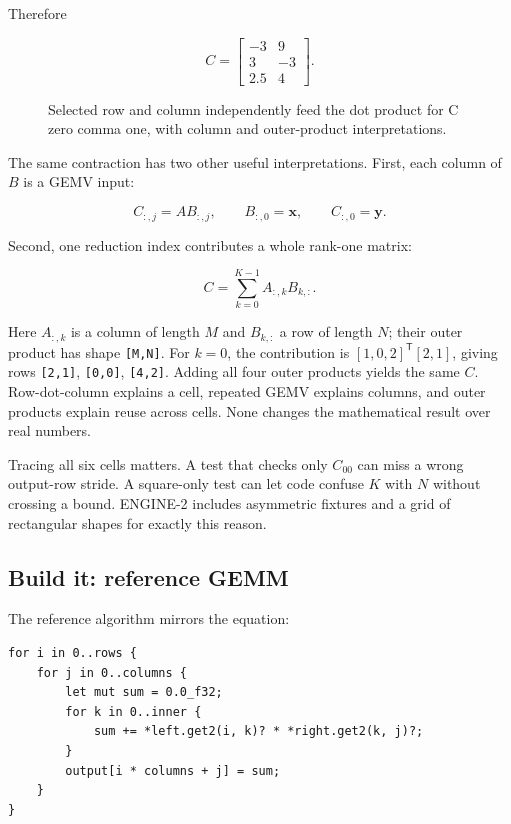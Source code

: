 \documentclass[
  10pt,
]{article}
\begin{document}
Therefore

\[
C=
\begin{bmatrix}
-3&9\\
3&-3\\
2.5&4
\end{bmatrix}.
\]

\begin{figure}[H]\centering\resizebox{\linewidth}{!}{}\caption{Selected row and column independently feed the dot product for C zero comma one, with column and outer-product interpretations.}\end{figure}

The same contraction has two other useful interpretations. First, each
column of \(B\) is a GEMV input:

\[
C_{:,j}=A B_{:,j},\qquad B_{:,0}=\mathbf{x},\qquad C_{:,0}=\mathbf{y}.
\]

Second, one reduction index contributes a whole rank-one matrix:

\[
C=\sum_{k=0}^{K-1} A_{:,k}B_{k,:}.
\]

Here \(A_{:,k}\) is a column of length \(M\) and \(B_{k,:}\) a row of
length \(N\); their outer product has shape \texttt{{[}M,N{]}}. For
\(k=0\), the contribution is \([1,0,2]^{\mathsf T}[2,1]\), giving rows
\texttt{{[}2,1{]}}, \texttt{{[}0,0{]}}, \texttt{{[}4,2{]}}. Adding all
four outer products yields the same \(C\). Row-dot-column explains a
cell, repeated GEMV explains columns, and outer products explain reuse
across cells. None changes the mathematical result over real numbers.

Tracing all six cells matters. A test that checks only \(C_{00}\) can
miss a wrong output-row stride. A square-only test can let code confuse
\(K\) with \(N\) without crossing a bound. ENGINE-2 includes asymmetric
fixtures and a grid of rectangular shapes for exactly this reason.

\subsection{Build it: reference GEMM}\label{build-it-reference-gemm}

The reference algorithm mirrors the equation:

\begin{verbatim}
for i in 0..rows {
    for j in 0..columns {
        let mut sum = 0.0_f32;
        for k in 0..inner {
            sum += *left.get2(i, k)? * *right.get2(k, j)?;
        }
        output[i * columns + j] = sum;
    }
}
\end{verbatim}
\end{document}
